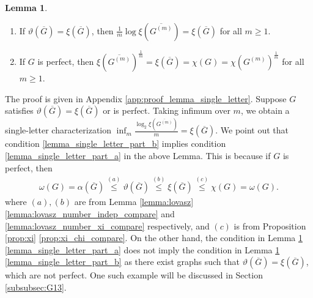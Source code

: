 \documentclass[journal, onecolumn, draftcls]{IEEEtran}
\theoremstyle{definition}
\newtheorem{lemma}{Lemma}
\newcommand{\meng}[1]{\marginpar{+}{\bf Ruoyu's remark}: {\em #1}}
\newcommand{\aditya}[1]{\marginpar{+}{\bf Aditya's remark}: {\em #1}}
\begin{document}
\begin{lemma}\label{lemma_single_letter}
    \begin{enumerate}[label=(\alph*)]
        \item If $\vartheta(\overline{G}) = \xi(\overline{G})$, then $\frac{1}{m}\log \xi(\overline{G^{(m)}}) =\xi (\overline{G})$ for all $m\ge 1$.  \label{lemma_single_letter_part_a}
        \item If $G$ is perfect, then $\xi(\overline{G^{(m)}})^{\frac{1}{m}} =\xi (\overline{G}) = \chi(G)=\chi(G^{(m)})^{\frac{1}{m}}$ for all $m\ge 1$.\label{lemma_single_letter_part_b} 
    \end{enumerate}
\end{lemma} The proof is given in Appendix \ref{app:proof_lemma_single_letter}. %
Suppose $G$ satisfies $\vartheta(\overline{G}) = \xi(\overline{G})$ or  is perfect. Taking infimum over $m$, we obtain a single-letter characterization  $\inf_m \frac{\log_2\xi(\overline{G^{(m)}})}{m} =\xi (\overline{G})$.  We point out that condition \ref{lemma_single_letter_part_b} implies condition \ref{lemma_single_letter_part_a} in the above Lemma. This is because if $G$ is perfect, then
\begin{align*}
    \omega(G) = \alpha(\overline{G}) \overset{(a)}{\le}  \vartheta(\overline{G})\overset{(b)}{\le}\xi(\overline{G})\overset{(c)}{\le}\chi(G) =\omega(G).
\end{align*}
where $(a),(b)$ are from  Lemma \ref{lemma:lovasz} \ref{lemma:lovasz_number_indep_compare} and \ref{lemma:lovasz_number_xi_compare} respectively, and $(c)$ is from Proposition \ref{prop:xi} \ref{prop:xi_chi_compare}. On the other hand, the condition in Lemma \ref{lemma_single_letter} \ref{lemma_single_letter_part_a} does not imply the condition in Lemma \ref{lemma_single_letter} \ref{lemma_single_letter_part_b} as there exist graphs such that $\vartheta(\overline{G}) = \xi(\overline{G})$, which are not perfect. One such example will be discussed in Section \ref{subsubsec:G13}.  %
\end{document}
